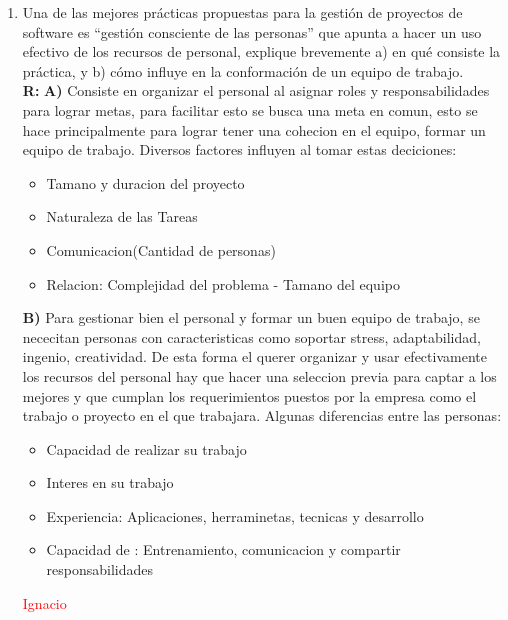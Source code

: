 \begin{enumerate}
	\item  Una de las mejores prácticas propuestas para la gestión de proyectos de software es “gestión consciente de las personas” que apunta a hacer un uso efectivo de los recursos de personal, explique brevemente a) en qué consiste la práctica, y b) cómo influye en la conformación de un equipo de trabajo.\\
	\textbf{R:} \textbf{A)} Consiste en organizar el personal al asignar roles y responsabilidades para lograr metas, para facilitar esto se busca una meta en comun, esto se hace principalmente para lograr tener una cohecion en el equipo, formar un equipo de trabajo. Diversos factores influyen al tomar estas deciciones:
                 \begin{itemize}
                         \item Tamano y duracion del proyecto
                         \item Naturaleza de las Tareas
                         \item Comunicacion(Cantidad de personas)
                         \item Relacion: Complejidad del problema - Tamano del equipo
                 \end{itemize}
		    \textbf{B)} Para gestionar bien el personal y formar un buen equipo de trabajo, se nececitan personas con caracteristicas como soportar stress, adaptabilidad, ingenio, creatividad. De esta forma el querer organizar y usar efectivamente los recursos del personal hay que hacer una seleccion previa para captar a los mejores y que cumplan los requerimientos puestos por la empresa como el trabajo o proyecto en el que trabajara. Algunas diferencias entre las personas:
                 \begin{itemize}
                         \item Capacidad de realizar su trabajo
                         \item Interes en su trabajo
                         \item Experiencia: Aplicaciones, herraminetas, tecnicas y desarrollo
                         \item Capacidad de : Entrenamiento, comunicacion y compartir responsabilidades
                 \end{itemize}
	\textcolor{red}{Ignacio}


\end{enumerate}

